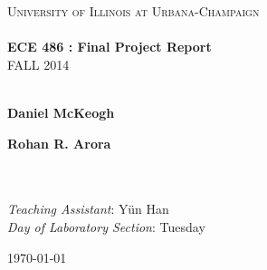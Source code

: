 \begin{titlepage}
	\begin{center}

		\textsc{\LARGE University of Illinois at Urbana-Champaign}\\[1.5cm]

		\HRule\\[0.4cm]
		{\huge \bfseries ECE 486 : Final Project Report \\[0.4cm] }
		\uppercase{Fall 2014}\\[0.5cm]

		\HRule\\[1.5cm]
                
		\noindent
		\begin{minipage}{0.4\textwidth}
			\begin{flushleft} \large
				\textbf{Daniel McKeogh} %
			\end{flushleft}
		\end{minipage}%
		\begin{minipage}{0.4\textwidth}
			\begin{flushright} \large
				\textbf{Rohan R. Arora} %
			\end{flushright}
		\end{minipage}
		\\~\\
		\textit{Teaching Assistant}: Y\"{u}n Han\\ %
		\textit{Day of Laboratory Section}: Tuesday %

		\vfill

		{\large \today} %

	\end{center}
\end{titlepage}








